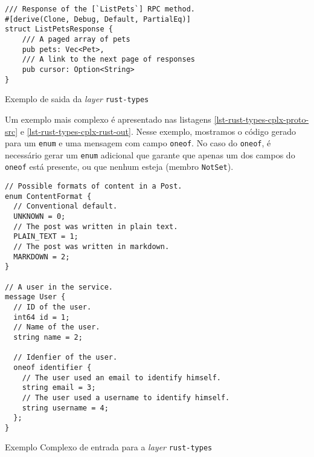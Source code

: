 \begin{listing}
\begin{verbatim}
/// Response of the [`ListPets`] RPC method.
#[derive(Clone, Debug, Default, PartialEq)]
struct ListPetsResponse {
    /// A paged array of pets
    pub pets: Vec<Pet>,
    /// A link to the next page of responses
    pub cursor: Option<String>
}
\end{verbatim}
\caption{Exemplo de saida da \textit{layer} \texttt{rust-types}}
\label{lst-rust-types-rust-out}
\end{listing}

Um exemplo mais complexo é apresentado nas listagens \ref{lst-rust-types-cplx-proto-src} e
\ref{lst-rust-types-cplx-rust-out}. Nesse exemplo, mostramos o código gerado para um \texttt{enum}
e uma mensagem com campo \texttt{oneof}. No caso do \texttt{oneof}, é necessário gerar um
\texttt{enum} adicional que garante que apenas um dos campos do \texttt{oneof} está presente,
ou que nenhum esteja (membro \texttt{NotSet}).

\begin{listing}
\begin{verbatim}
// Possible formats of content in a Post.
enum ContentFormat {
  // Conventional default.
  UNKNOWN = 0;
  // The post was written in plain text.
  PLAIN_TEXT = 1;
  // The post was written in markdown.
  MARKDOWN = 2;
}

// A user in the service.
message User {
  // ID of the user.
  int64 id = 1;
  // Name of the user.
  string name = 2;

  // Idenfier of the user.
  oneof identifier {
    // The user used an email to identify himself.
    string email = 3;
    // The user used a username to identify himself.
    string username = 4;
  };
}
\end{verbatim}
\caption{Exemplo Complexo de entrada para a \textit{layer} \texttt{rust-types}}
\label{lst-rust-types-cplx-proto-src}
\end{listing}

